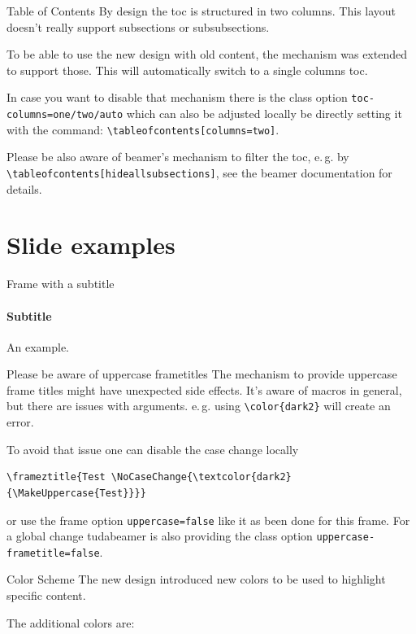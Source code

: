 \documentclass[
	english,%
	accentcolor=9c,%
]{tudabeamer}
\newcommand*{\code}[1]{\texttt{#1}}
\begin{document}
\begin{frame}{Table of Contents}
	By design the toc is structured in two columns. This layout doesn't really support subsections or subsubsections.

	To be able to use the new design with old content, the mechanism was extended to support those. This will automatically switch to a single columns toc.

	In case you want to disable that mechanism there is the class option \code{toc-columns=one/two/auto} which can also be adjusted locally be directly setting it with the command:
	\code{\textbackslash{}tableofcontents[columns=two]}.

	Please be also aware of beamer's mechanism to filter the toc, e.\,g. by \code{\textbackslash{}tableofcontents[hideallsubsections]}, see the beamer documentation for details.
\end{frame}

\section{Slide examples}

\begin{frame}{Frame with a subtitle}
	\framesubtitle{Subtitle}
	An example.
\end{frame}

\begin{frame}[fragile,uppercase=false]{Please be aware of uppercase frametitles}
	The mechanism to provide uppercase frame titles might have unexpected side effects.
	It's aware of macros in general, but there are issues with arguments. e.\,g. using \verb+\color{dark2}+ will create an error.

	To avoid that issue one can disable the case change locally
\begin{verbatim}
\frameztitle{Test \NoCaseChange{\textcolor{dark2}{\MakeUppercase{Test}}}}
\end{verbatim}
	or use the frame option \verb+uppercase=false+ like it as been done for this frame.
	For a global change tudabeamer is also providing the class option \verb+uppercase-frametitle=false+.
\end{frame}

\begin{frame}{Color Scheme}
	The new design introduced new colors to be used to highlight specific content.

	The additional colors are:

	\renewcommand*{\do}[1]{TUDa-####1: \textcolor{TUDa-####1}{\rule{1cm}{\ht\strutbox}}\par}
\end{frame}
\end{document}
